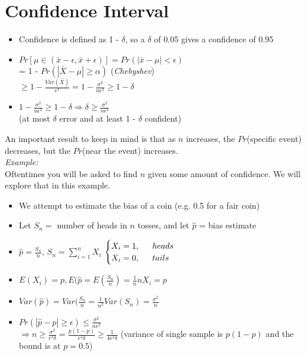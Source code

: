 \documentclass[a4paper]{article}
\begin{document}
\section{Confidence Interval}
\begin{itemize}
        \item Confidence is defined as 1 - $\delta$, so a $\delta $ of 0.05 gives a confidence of 0.95
        \item $Pr[\mu \in (\bar x - \epsilon, \bar x + \epsilon)] = Pr(|\bar x - \mu| < \epsilon)$ \\
        = 1 - $Pr(|\bar X-\mu| \geq \alpha)$ (\textit{Chebyshev})\\
        $\geq 1 - \frac{Var(\bar X)}{\epsilon^2} = 1 - \frac{\sigma^2}{n\epsilon^2} \geq 1 - \delta$
        \item $1 - \frac{\sigma^2}{n\epsilon^2} \geq 1 - \delta \Rightarrow \delta \geq \frac{\sigma^2}{n\epsilon^2}$\\ (at most $\delta$ error and at least 1 - $\delta$ confident)
\end{itemize}
An important result to keep in mind is that as $n$ increases, the $Pr$(specific event) decreases, but the $Pr$(near the event) increases.\\
\textit{Example:}\\
Oftentimes you will be asked to find $n$ given some amount of confidence. We will explore that in this example.
\begin{itemize}
    \item We attempt to estimate the bias of a coin (e.g. 0.5 for a fair coin)
    \item Let $S_n = $ number of heads in $n$ tosses, and let $\hat{p}$ = bias estimate
    \item $\hat{p} = \frac{S_n}{n}$, $S_n = \sum_{i=1}^{n}X_i$ 
    $\begin{cases}
        X_i = 1,\indent heads\\
        X_i = 0, \indent tails
    \end{cases}$
    \item $E(X_i) = p, E(\hat{p} = E(\frac{S_n}{n}) = \frac{1}{n}nX_i = p$
    \item $Var(\hat{p}) = Var(\frac{S_n}{n} = \frac{1}{n^2}Var(S_n) = \frac{\sigma^2}{n}$
    \item $Pr(|\hat{p} - p| \geq \epsilon) \leq \frac{\sigma^2}{n\epsilon^2}$\\
    $\Rightarrow n \geq \frac{\sigma^2}{\epsilon^2\delta} = \frac{p(1-p)}{\epsilon^2\delta} \geq \frac{1}{4\epsilon^2\delta}$ (variance of single sample is $p(1-p)$ and the bound is at $p = 0.5$)

\end{itemize}
\end{document}
